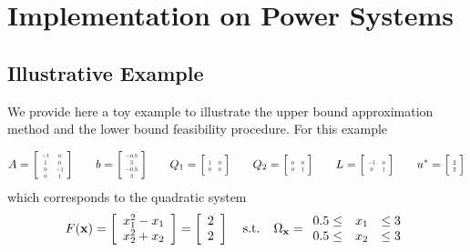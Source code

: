 \section{Implementation on Power Systems} \label{sec:numstd}  
\subsection{Illustrative Example}
We provide here a toy example to illustrate the upper bound approximation method and the lower bound feasibility procedure. 
For this example

$$A=
\left[
\scalebox{0.5}{%
	\begin{tabular}{ c c }
	$-1$ & $0$  \\ 
	$1$ & $0$  \\  
	$0$ & $-1$ \\
	$0$ & $1$  
	\end{tabular}%
} 
\right] \hspace*{0.25in} b=
\left[
\scalebox{0.5}{%
	\begin{tabular}{ c }
	$-0.5$  \\ 
	$3$ \\  
	$-0.5$ \\
	$3$  
	\end{tabular}%
} 
\right] \hspace*{0.25in} Q_1=
\left[
\scalebox{0.5}{%
	\begin{tabular}{ c c }
	$1$ & $0$  \\ 
	$0$ & $0$  
	\end{tabular}%
} 
\right] \hspace*{0.25in} Q_2=
\left[
\scalebox{0.5}{%
	\begin{tabular}{ c c }
	$0$ & $0$  \\ 
	$0$ & $1$  
	\end{tabular}%
} 
\right] \hspace*{0.25in} L=
\left[
\scalebox{0.5}{%
	\begin{tabular}{ c c }
	$-1$ & $0$  \\ 
	$0$ & $1$  
	\end{tabular}%
} 
\right] \hspace*{0.25in} u^*=
\left[
\scalebox{0.5}{%
	\begin{tabular}{ c }
	$2$  \\ 
	$2$   
	\end{tabular}%
} 
\right]
$$
which corresponds to the quadratic system 
$$F(\mathbf{x})=\left[\begin{array}{r} x_1^2-x_1 \\ x_2^2+x_2 \end{array}\right]=\left[\begin{array}{r} 2 \\ 2 \end{array}\right] \hspace*{0.15in} \text{s.t.} \hspace*{0.15in} \Omega_{\mathbf{x}}=\begin{array}{rcl} 0.5\leq & x_1 & \leq 3 \\ 0.5\leq & x_2 & \leq 3 \end{array} $$

